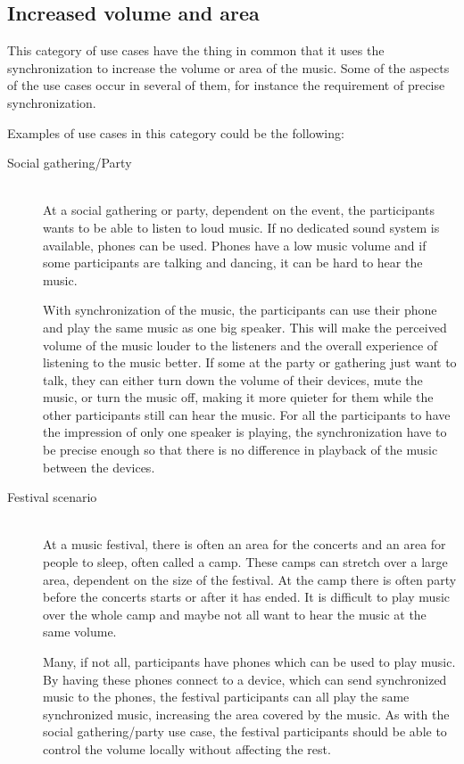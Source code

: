 \subsection{Increased volume and area}
This category of use cases have the thing in common that it uses the synchronization to increase the volume or area of the music.
Some of the aspects of the use cases occur in several of them, for instance the requirement of precise synchronization.

Examples of use cases in this category could be the following:

\begin{description}
    \item[Social gathering/Party] \hfill\\
        At a social gathering or party, dependent on the event, the participants wants to be able to listen to loud music.
        If no dedicated sound system is available, phones can be used. 
        Phones have a low music volume and if some participants are talking and dancing, it can be hard to hear the music.

        With synchronization of the music, the participants can use their phone and play the same music as one big speaker.
        This will make the perceived volume of the music louder to the listeners and the overall experience of listening to the music better.
        If some at the party or gathering just want to talk, they can either turn down the volume of their devices, mute the music, or turn the music off,
        making it more quieter for them while the other participants still can hear the music.
        For all the participants to have the impression of only one speaker is playing, 
        the synchronization have to be precise enough so that there is no difference in playback of the music between the devices.

    \item[Festival scenario] \hfill\\
        At a music festival, there is often an area for the concerts and an area for people to sleep, often called a camp.
        These camps can stretch over a large area, dependent on the size of the festival.
        At the camp there is often party before the concerts starts or after it has ended.
        It is difficult to play music over the whole camp and maybe not all want to hear the music at the same volume.

        Many, if not all, participants have phones which can be used to play music.
        By having these phones connect to a device, which can send synchronized music to the phones,
        the festival participants can all play the same synchronized music,
        increasing the area covered by the music.
        As with the social gathering/party use case,
        the festival participants should be able to control the volume locally without affecting the rest.


\end{description}
